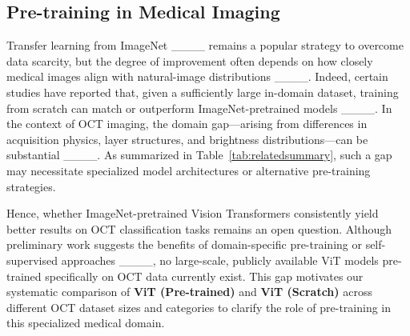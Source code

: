 	\subsection{Pre-training in Medical Imaging}
	Transfer learning from ImageNet ____ remains a popular strategy to overcome data scarcity, but the degree of improvement often depends on how closely medical images align with natural-image distributions ____. Indeed, certain studies have reported that, given a sufficiently large in-domain dataset, training from scratch can match or outperform ImageNet-pretrained models ____. In the context of OCT imaging, the domain gap—arising from differences in acquisition physics, layer structures, and brightness distributions—can be substantial ____. As summarized in Table~\ref{tab:relatedsummary}, such a gap may necessitate specialized model architectures or alternative pre-training strategies.
	
	Hence, whether ImageNet-pretrained Vision Transformers consistently yield better results on OCT classification tasks remains an open question. Although preliminary work suggests the benefits of domain-specific pre-training or self-supervised approaches ____, no large-scale, publicly available ViT models pre-trained specifically on OCT data currently exist. This gap motivates our systematic comparison of \textbf{ViT (Pre-trained)} and \textbf{ViT (Scratch)} across different OCT dataset sizes and categories to clarify the role of pre-training in this specialized medical domain.
